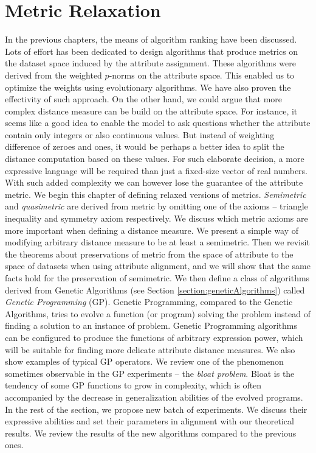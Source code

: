 \chapter{Metric Relaxation}
\label{chapter:metricRelaxation}
In the previous chapters, the means of algorithm ranking have been discussed. Lots of effort has been dedicated to design algorithms that produce metrics on the dataset space induced by the attribute assignment. These algorithms were derived from the weighted $p$-norms on the attribute space. This enabled us to optimize the weights using evolutionary algorithms. We have also proven the effectivity of such approach. On the other hand, we could argue that more complex distance measure can be build on the attribute space. For instance, it seems like a good idea to enable the model to ask questions whether the attribute contain only integers or also continuous values. But instead of weighting difference of zeroes and ones, it would be perhaps a better idea to split the distance computation based on these values. For such elaborate decision, a more expressive language will be required than just a fixed-size vector of real numbers. With such added complexity we can however lose the guarantee of the attribute metric. We begin this chapter of defining relaxed versions of metrics. \emph{Semimetric} and \emph{quasimetric} are derived from metric by omitting one of the axioms -- triangle inequality and symmetry axiom respectively. We discuss which metric axioms are more important when defining a distance measure. We present a simple way of modifying arbitrary distance measure to be at least a semimetric. Then we revisit the theorems about preservations of metric from the space of attribute to the space of datasets when using attribute alignment, and we will show that the same facts hold for the preservation of semimetric. We then define a class of algorithms derived from Genetic Algorithms (see Section \ref{section:geneticAlgorithms}) called \emph{Genetic Programming} (GP). Genetic Programming, compared to the Genetic Algorithms, tries to evolve a function (or program) solving the problem instead of finding a solution to an instance of problem. Genetic Programming algorithms can be configured to produce the functions of arbitrary expression power, which will be suitable for finding more delicate attribute distance measures. We also show examples of typical GP operators. We review one of the phenomenon sometimes observable in the GP experiments -- the \emph{bloat problem}. Bloat is the tendency of some GP functions to grow in complexity, which is often accompanied by the decrease in generalization abilities of the evolved programs. In the rest of the section, we propose new batch of experiments. We discuss their expressive abilities and set their parameters in alignment with our theoretical results. We review the results of the new algorithms compared to the previous ones.

